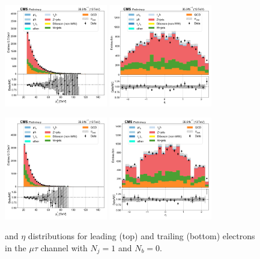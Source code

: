 \begin{figure}[htb!]
    \centering
    \includegraphics[width=0.4\textwidth]{chapters/Analysis/sectionPlots/figures/data_mc_overlays/mutau_2016_cat_eq1_eq0_signal_linear_lepton_lepton1_pt}
    \includegraphics[width=0.4\textwidth]{chapters/Analysis/sectionPlots/figures/data_mc_overlays/mutau_2016_cat_eq1_eq0_signal_linear_lepton_lepton1_eta}

    \includegraphics[width=0.4\textwidth]{chapters/Analysis/sectionPlots/figures/data_mc_overlays/mutau_2016_cat_eq1_eq0_signal_linear_lepton_lepton2_pt}
    \includegraphics[width=0.4\textwidth]{chapters/Analysis/sectionPlots/figures/data_mc_overlays/mutau_2016_cat_eq1_eq0_signal_linear_lepton_lepton2_eta}
    \caption{\pt and $\eta$ distributions for leading (top) and trailing
        (bottom) electrons in the $\mu\tau$ channel with $N_{j} = 1$ and
        $N_{b} = 0$.}
    \label{fig:analysis:plots:mutau_2_kinematic}
\end{figure}

